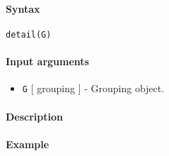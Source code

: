 


	\paragraph{Syntax}\label{syntax}

\begin{verbatim}
detail(G)
\end{verbatim}

\paragraph{Input arguments}\label{input-arguments}

\begin{itemize}
\itemsep1pt\parskip0pt
\item
  \texttt{G} {[} grouping {]} - Grouping object.
\end{itemize}

\paragraph{Description}\label{description}

\paragraph{Example}\label{example}


